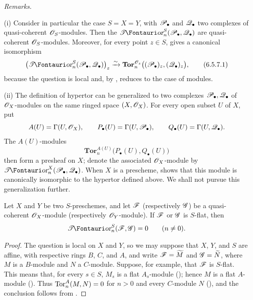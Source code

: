 \begin{env}[6.5.7]
\label{III.6.5.7}
\emph{Remarks.}

\textnormal{(i)} Consider in particular the case $S=X=Y$, with
$\mathscr{P}_\bullet$ and $\mathscr{Q}_\bullet$ two complexes of
quasi-coherent $\mathscr{O}_S$-modules.  Then the
$\shTor_n^S(\sh P_\bullet,\sh Q_\bullet)$ are quasi-coherent
$\mathscr{O}_S$-modules.  Moreover, for every point $z\in S$,
 gives a canonical isomorphism
\[
  \bigl(\shTor_n^S(\sh P_\bullet,\sh Q_\bullet)\bigr)_z
  \xrightarrow{\sim}
  \mathbf{Tor}_n^{\sh O_z}
  \bigl((\sh P_\bullet)_z,(\sh Q_\bullet)_z\bigr),
  \tag{6.5.7.1}\label{III.6.5.7.1}
\]
because the question is local and, by ,
reduces to the case of modules.

\textnormal{(ii)} The definition of hypertor can be generalized
to two complexes $\mathscr{P}_\bullet,\mathscr{Q}_\bullet$ of
$\mathscr{O}_X$-modules on the same ringed space $(X,\mathscr{O}_X)$.  For
every open subset $U$ of $X$, put
\[
  A(U)=\Gamma(U,\mathscr{O}_X),\qquad
  P_\bullet(U)=\Gamma(U,\mathscr{P}_\bullet),\qquad
  Q_\bullet(U)=\Gamma(U,\mathscr{Q}_\bullet).
\]
The $A(U)$-modules
\[
  \mathbf{Tor}_n^{A(U)}\bigl(P_\bullet(U),Q_\bullet(U)\bigr)
\]
then form a presheaf on $X$; denote the associated
$\mathscr{O}_X$-module by
$\shTor_n^X(\sh P_\bullet,\sh Q_\bullet)$.  When $X$ is a
prescheme,  shows that this module is
canonically isomorphic to the hypertor defined above.  We shall
not pursue this generalization further.
\end{env}

\begin{proposition}[6.5.8]
\label{III.6.5.8}
Let $X$ and $Y$ be two $S$-preschemes, and let $\mathscr{F}$
(respectively $\mathscr{G}$) be a quasi-coherent $\mathscr{O}_X$-module
(respectively $\mathscr{O}_Y$-module).  If $\mathscr{F}$ or $\mathscr{G}$ is
$S$-flat, then
\[
  \shTor_n^S(\sh F,\sh G)=0\qquad(n\ne0).
\]
\end{proposition}

\begin{proof}
The question is local on $X$ and $Y$, so we may suppose that
$X$, $Y$, and $S$ are affine, with respective rings $B$, $C$,
and $A$, and write $\mathscr{F}=\widetilde M$ and
$\mathscr{G}=\widetilde N$, where $M$ is a $B$-module and $N$ a
$C$-module.  Suppose, for example, that $\mathscr{F}$ is $S$-flat.
This means that, for every $s\in S$, $M_s$ is a flat
$A_s$-module (); hence $M$ is a flat
$A$-module ().  Thus
$\operatorname{Tor}_n^A(M,N)=0$ for $n>0$ and every $C$-module $N$
(), and the conclusion follows from
.
\end{proof}

